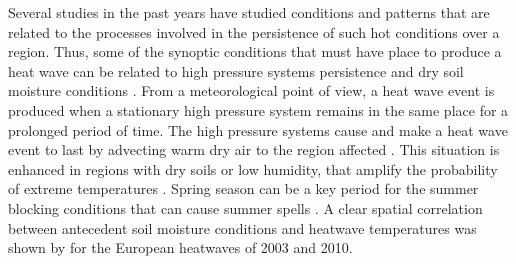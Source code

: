 Several studies in the past
years have studied conditions and patterns that are related to the
processes involved in the persistence of such hot conditions over a region.
Thus, some of the synoptic conditions that must have place to produce  a heat wave can
be related to high pressure systems persistence and dry soil moisture 
conditions \cite{del_al2007, fis_al2007, cou_rah2012, lau_nat2012, bru_al2018,
sch_al2018}. From a meteorological point of view, 
a heat wave event is produced when a stationary high pressure system  remains in the
same place for a prolonged period of time. The high 
pressure systems cause and make a heat wave event to last by advecting 
warm dry air to the region affected \cite{per2015}. This situation is 
enhanced in regions with dry soils or low humidity, that amplify the 
probability of extreme temperatures \cite{sil_al2017}. Spring season can be a key
period for the summer blocking conditions that can cause 
summer spells \cite{bru_al2017}. A clear spatial 
correlation between antecedent soil moisture conditions and 
heatwave temperatures was shown by \cite{sil_al2017} for the European heatwaves of 2003 and 2010.

